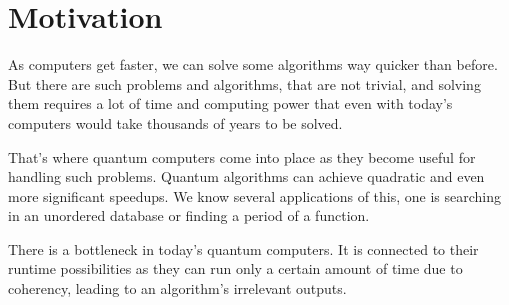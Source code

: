 \chapter{Motivation}
As computers get faster, we can solve some algorithms way quicker than before. But there are such problems and algorithms, that are not trivial, and solving them requires a lot of time and computing power that even with today's computers would take thousands of years to be solved.

That's where quantum computers come into place as they become useful for handling such problems. Quantum algorithms can achieve quadratic and even more significant speedups. We know several applications of this, one is searching in an unordered database or finding a period of a function.

There is a bottleneck in today's quantum computers. It is connected to their runtime possibilities as they can run only a certain amount of time due to coherency, leading to an algorithm's irrelevant outputs.  
\endinput